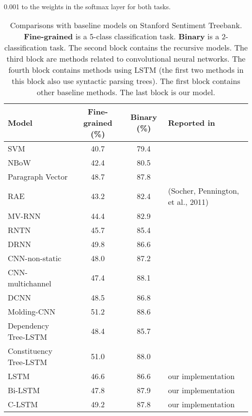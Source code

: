 \documentclass[11pt,letterpaper]{article}
\begin{document}
0.001 to the weights in the softmax layer for both tasks.
\begin{table*}[t]
\begin{center}
\begin{tabular}{l|c|c|l}
\hline
\bf Model & \bf Fine-grained (\%)  & \bf Binary (\%) & \bf Reported in\\
\hline
SVM       & 40.7             & 79.4                & \cite{socher2013}\\
NBoW      & 42.4             & 80.5                & \cite{dcnn}\\
Paragraph Vector  & 48.7     & 87.8                & \cite{pv}\\
\hline
RAE       & 43.2             & 82.4                & (Socher, Pennington, et al., 2011)\\
MV-RNN    & 44.4             & 82.9                & \cite{mvrnn}\\
RNTN      & 45.7             & 85.4                & \cite{socher2013}\\
DRNN              & 49.8     & 86.6                & \cite{drnn}\\
\hline
CNN-non-static    & 48.0     & 87.2                & \cite{kim}\\
CNN-multichannel  & 47.4     & 88.1                & \cite{kim}\\
DCNN     & 48.5              & 86.8                & \cite{dcnn}\\
Molding-CNN & 51.2           & 88.6                & \cite{tao}\\
\hline
Dependency Tree-LSTM & 48.4  & 85.7                & \cite{tai2015}\\
Constituency Tree-LSTM & 51.0& 88.0                & \cite{tai2015}\\
LSTM     & 46.6              & 86.6                & our implementation\\
Bi-LSTM  & 47.8              & 87.9                & our implementation\\
\hline
C-LSTM   & 49.2              & 87.8                & our implementation\\
\hline
\end{tabular}
\end{center}
\caption{\label{sst} Comparisons with baseline models on Stanford
Sentiment Treebank. {\bf Fine-grained} is a 5-class classification task.
{\bf Binary} is a 2-classification task. The second block contains
the recursive models. The third block are methods related to convolutional
neural networks. The fourth block contains methods using LSTM (the first
two methods in this block also use syntactic parsing trees). The first
block contains other baseline methods. The last block is our model.}
\end{table*}
\end{document}
